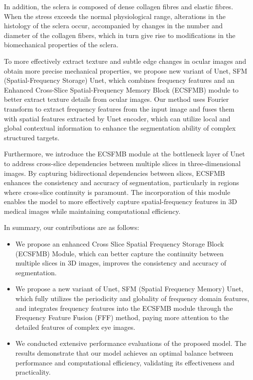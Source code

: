 \documentclass[AMA,Times1COL]{WileyNJDv5} %
\begin{document}
In addition, the sclera is composed of dense collagen fibres and elastic fibres\cite{campbell2021biomechanical}. When the stress exceeds the normal physiological range, alterations in the histology of the sclera occur, accompanied by changes in the number and diameter of the collagen fibers, which in turn give rise to modifications in the biomechanical properties of the sclera\cite{yasir2024scleral}. 

To more effectively extract texture and subtle edge changes in ocular images and obtain more precise mechanical properties, we propose new variant of Unet, SFM (Spatial-Frequency Storage) Unet, which combines frequency features and an Enhanced Cross-Slice Spatial-Frequency Memory Block (ECSFMB) module to better extract texture details from ocular images. Our method uses Fourier transform to extract frequency features from the input image and fuses them with spatial features extracted by Unet encoder, which can utilize local and global contextual information to enhance the segmentation ability of complex structured targets. 

Furthermore, we introduce the ECSFMB module at the bottleneck layer of Unet to address cross-slice dependencies between multiple slices in three-dimensional images. By capturing bidirectional dependencies between slices, ECSFMB enhances the consistency and accuracy of segmentation, particularly in regions where cross-slice continuity is paramount. The incorporation of this module enables the model to more effectively capture spatial-frequency features in 3D medical images while maintaining computational efficiency.

In summary, our contributions are as follows:
\begin{itemize}
    \item We propose an enhanced Cross Slice Spatial Frequency Storage Block (ECSFMB) Module, which can better capture the continuity between multiple slices in 3D images, improves the consistency and accuracy of segmentation.
    \item We propose a new variant of Unet, SFM (Spatial Frequency Memory) Unet, which fully utilizes the periodicity and globality of frequency domain features, and integrates frequency features into the ECSFMB module through the Frequency Feature Fusion (FFF) method, paying more attention to the detailed features of complex eye images.
    \item We conducted extensive performance evaluations of the proposed model. The results demonstrate that our model achieves an optimal balance between performance and computational efficiency, validating its effectiveness and practicality.
\end{itemize}
\end{document}
